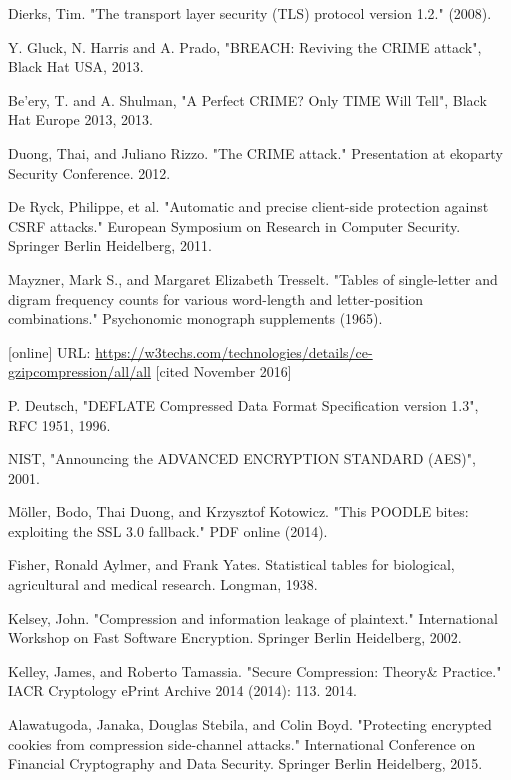 \documentclass[conference, letterpaper, 10pt]{IEEEtran}
\begin{document}
\begin{thebibliography}{13}

 Dierks, Tim. "The transport layer security (TLS) protocol version
1.2." (2008).

 Y. Gluck, N. Harris and A. Prado, "BREACH: Reviving the CRIME attack",
Black Hat USA, 2013.

 Be'ery, T. and A. Shulman, "A Perfect CRIME? Only TIME Will Tell",
Black Hat Europe 2013, 2013.

 Duong, Thai, and Juliano Rizzo. "The CRIME attack." Presentation at
ekoparty Security Conference. 2012.

 De Ryck, Philippe, et al. "Automatic and precise client-side
protection against CSRF attacks." European Symposium on Research in Computer
Security. Springer Berlin Heidelberg, 2011.

 Mayzner, Mark S., and Margaret Elizabeth Tresselt. "Tables of
single-letter and digram frequency counts for various word-length and
letter-position combinations." Psychonomic monograph supplements (1965).

 [online] URL:
\url{https://w3techs.com/technologies/details/ce-gzipcompression/all/all} [cited
November 2016]

 P. Deutsch, "DEFLATE Compressed Data Format Specification version
1.3", RFC 1951, 1996.

 NIST, "Announcing the ADVANCED ENCRYPTION STANDARD (AES)", 2001.

 Möller, Bodo, Thai Duong, and Krzysztof Kotowicz. "This POODLE
bites: exploiting the SSL 3.0 fallback." PDF online (2014).

 Fisher, Ronald Aylmer, and Frank Yates. Statistical tables for
biological, agricultural and medical research. Longman, 1938.

 Kelsey, John. "Compression and information leakage of plaintext."
International Workshop on Fast Software Encryption. Springer Berlin Heidelberg,
2002.

 Kelley, James, and Roberto Tamassia. "Secure Compression: Theory\&
Practice." IACR Cryptology ePrint Archive 2014 (2014): 113.  2014.

 Alawatugoda, Janaka, Douglas Stebila, and Colin Boyd. "Protecting
encrypted cookies from compression side-channel attacks." International
Conference on Financial Cryptography and Data Security. Springer Berlin
Heidelberg, 2015.


\end{thebibliography}
\end{document}
